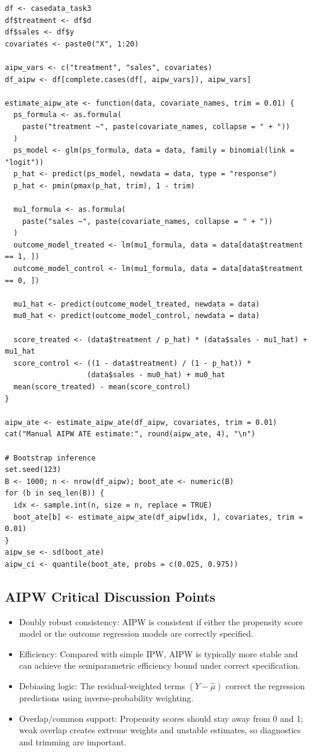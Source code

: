 \documentclass[12pt,a4paper]{article}
\begin{document}
\begin{lstlisting}
df <- casedata_task3
df$treatment <- df$d
df$sales <- df$y
covariates <- paste0("X", 1:20)

aipw_vars <- c("treatment", "sales", covariates)
df_aipw <- df[complete.cases(df[, aipw_vars]), aipw_vars]

estimate_aipw_ate <- function(data, covariate_names, trim = 0.01) {
  ps_formula <- as.formula(
    paste("treatment ~", paste(covariate_names, collapse = " + "))
  )
  ps_model <- glm(ps_formula, data = data, family = binomial(link = "logit"))
  p_hat <- predict(ps_model, newdata = data, type = "response")
  p_hat <- pmin(pmax(p_hat, trim), 1 - trim)

  mu1_formula <- as.formula(
    paste("sales ~", paste(covariate_names, collapse = " + "))
  )
  outcome_model_treated <- lm(mu1_formula, data = data[data$treatment == 1, ])
  outcome_model_control <- lm(mu1_formula, data = data[data$treatment == 0, ])

  mu1_hat <- predict(outcome_model_treated, newdata = data)
  mu0_hat <- predict(outcome_model_control, newdata = data)

  score_treated <- (data$treatment / p_hat) * (data$sales - mu1_hat) + mu1_hat
  score_control <- ((1 - data$treatment) / (1 - p_hat)) *
                   (data$sales - mu0_hat) + mu0_hat
  mean(score_treated) - mean(score_control)
}

aipw_ate <- estimate_aipw_ate(df_aipw, covariates, trim = 0.01)
cat("Manual AIPW ATE estimate:", round(aipw_ate, 4), "\n")

# Bootstrap inference
set.seed(123)
B <- 1000; n <- nrow(df_aipw); boot_ate <- numeric(B)
for (b in seq_len(B)) {
  idx <- sample.int(n, size = n, replace = TRUE)
  boot_ate[b] <- estimate_aipw_ate(df_aipw[idx, ], covariates, trim = 0.01)
}
aipw_se <- sd(boot_ate)
aipw_ci <- quantile(boot_ate, probs = c(0.025, 0.975))
\end{lstlisting}

\subsection{AIPW Critical Discussion Points}
\begin{itemize}
\item Doubly robust consistency: AIPW is consistent if either the propensity score model or the outcome regression models are correctly specified.
\item Efficiency: Compared with simple IPW, AIPW is typically more stable and can achieve the semiparametric efficiency bound under correct specification.
\item Debiasing logic: The residual-weighted terms $(Y - \hat{\mu})$ correct the regression predictions using inverse-probability weighting.
\item Overlap/common support: Propensity scores should stay away from 0 and 1; weak overlap creates extreme weights and unstable estimates, so diagnostics and trimming are important.
\end{itemize}
\end{document}
